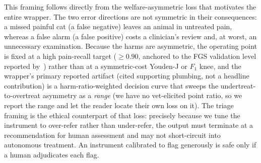 This framing follows directly from the welfare-asymmetric loss that motivates
the entire wrapper. The two error directions are not symmetric in their
consequences: a missed painful cat (a false negative) leaves an animal in
untreated pain, whereas a false alarm (a false positive) costs a clinician's
review and, at worst, an unnecessary examination. Because the harms are
asymmetric, the operating point is fixed at a high pain-recall target
($\geq 0.90$, anchored to the FGS validation level reported
by~\cite{evangelista2019}) rather than at a symmetric-cost Youden-J or $F_1$
knee, and the wrapper's primary reported artifact (cited supporting plumbing, not
a headline contribution) is a harm-ratio-weighted decision curve
that sweeps the undertreat-to-overtreat asymmetry as a \emph{range} (we have no
vet-elicited point ratio, so we report the range and let the reader locate their
own loss on it). The triage framing is the ethical counterpart of that loss:
precisely because we tune the instrument to over-refer rather than under-refer,
the output must terminate at a recommendation for human assessment and may not
short-circuit into autonomous treatment. An instrument calibrated to flag
generously is safe only if a human adjudicates each flag.

